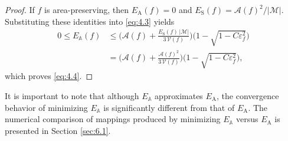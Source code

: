\documentclass{article}
\numberwithin{equation}{section}
\def\rS{\mathrm{S}}
\def\rA{\mathrm{A}}
\def\A{\mathcal{A}}
\def\bbA{\mathbb{A}}
\def\M{\mathcal{M}}
\def\bV{\mathscr{V}}
\begin{document}
\begin{proof}
If $f$ is area-preserving, then $E_\rA(f)=0$ and
$E_\rS(f)=\A(f)^2/|\M|$. Substituting these identities into \eqref{eq:4.3} yields
\begin{align*}
0\leq E_\bbA(f)
&\leq\bigg(\A(f)+\frac{E_\rS(f)\,|\M|}{3\,\bV(f)}\bigg)
  \Big(1-\sqrt{1-C\varepsilon_f^2}\Big)\\
&=\bigg(\A(f)+\frac{\A(f)^2}{3\,\bV(f)}\bigg)
  \Big(1-\sqrt{1-C\varepsilon_f^2}\Big),
\end{align*}
which proves \eqref{eq:4.4}.
\end{proof}

It is important to note that although $E_\bbA$ approximates $E_\rA$, the convergence behavior of minimizing $E_\bbA$ is significantly different from that of $E_\rA$. The numerical comparison of mappings produced by minimizing $E_\bbA$ versus $E_\rA$ is presented in Section \ref{sec:6.1}.
\end{document}
